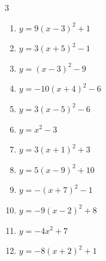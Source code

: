 \begin{multicols}{3}
\begin{enumerate}
  \item $\displaystyle y=9\left( x-3\right)^{2}+1$

        \phantom{$\displaystyle 頂点\left( 3 , 1 \right)$}

  \item $\displaystyle y=3\left( x+5\right)^{2}-1$

        \phantom{$\displaystyle 頂点\left( -5 , -1 \right)$}

  \item $\displaystyle y=\left( x-3\right)^{2}-9$

        \phantom{$\displaystyle 頂点\left( 3 , -9 \right)$}

  \item $\displaystyle y=-10\left( x+4\right)^{2}-6$

        \phantom{$\displaystyle 頂点\left( -4 , -6 \right)$}

  \item $\displaystyle y=3\left( x-5\right)^{2}-6$

        \phantom{$\displaystyle 頂点\left( 5 , -6 \right)$}

  \item $\displaystyle y=x^{2}-3$

        \phantom{$\displaystyle 頂点\left( 0 , -3 \right)$}

  \item $\displaystyle y=3\left( x+1\right)^{2}+3$

        \phantom{$\displaystyle 頂点\left( -1 , 3 \right)$}

  \item $\displaystyle y=5\left( x-9\right)^{2}+10$

        \phantom{$\displaystyle 頂点\left( 9 , 10 \right)$}

  \item $\displaystyle y=-\left( x+7\right)^{2}-1$

        \phantom{$\displaystyle 頂点\left( -7 , -1 \right)$}

\columnbreak %

  \item $\displaystyle y=-9\left( x-2\right)^{2}+8$

        \phantom{$\displaystyle 頂点\left( 2 , 8 \right)$}

  \item $\displaystyle y=-4x^{2}+7$

        \phantom{$\displaystyle 頂点\left( 0 , 7 \right)$}

  \item $\displaystyle y=-8\left( x+2\right)^{2}+1$


\end{enumerate}
\end{multicols}
